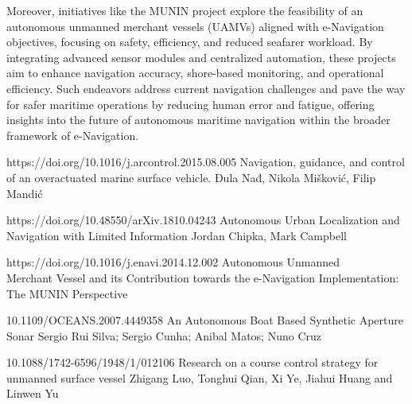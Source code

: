 Moreover, initiatives like the MUNIN project explore the feasibility of an autonomous unmanned merchant vessels (UAMVs) 
aligned with e-Navigation objectives, focusing on safety, efficiency, and reduced seafarer workload. By integrating 
advanced sensor modules and centralized automation, these projects aim to enhance navigation accuracy, shore-based 
monitoring, and operational efficiency. Such endeavors address current navigation challenges and pave the way for safer 
maritime operations by reducing human error and fatigue, offering insights into the future of autonomous maritime 
navigation within the broader framework of e-Navigation.

https://doi.org/10.1016/j.arcontrol.2015.08.005  Navigation, guidance, and control of an overactuated marine surface vehicle. 
            Đula Nađ, Nikola Mišković, Filip Mandić

https://doi.org/10.48550/arXiv.1810.04243 Autonomous Urban Localization and Navigation with Limited Information Jordan Chipka, Mark Campbell

https://doi.org/10.1016/j.enavi.2014.12.002  Autonomous Unmanned\\Merchant Vessel and its Contribution towards the e-Navigation Implementation: The MUNIN Perspective

10.1109/OCEANS.2007.4449358 An Autonomous Boat Based Synthetic Aperture Sonar Sergio Rui Silva; Sergio Cunha; Anibal Matos; Nuno Cruz

10.1088/1742-6596/1948/1/012106 Research on a course control strategy for unmanned surface vessel  Zhigang Luo, Tonghui Qian, Xi Ye, Jiahui Huang and Linwen Yu

